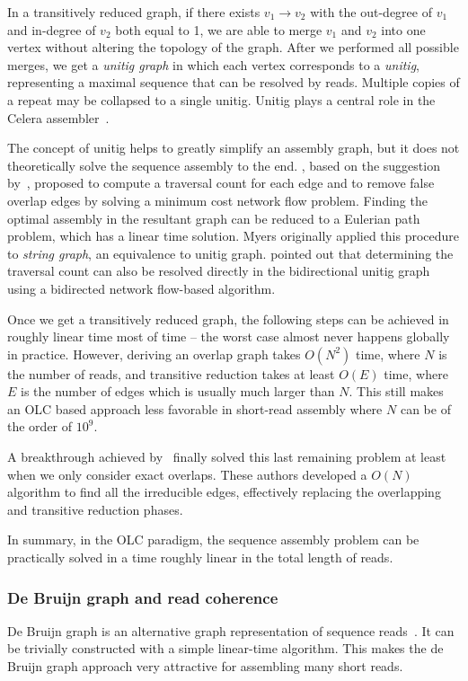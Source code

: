 \documentclass{bioinfo}
\begin{document}
\begin{methods}
In a transitively reduced graph, if there exists $v_1\to v_2$ with the
out-degree of $v_1$ and in-degree of $v_2$ both equal to 1, we are able
to merge $v_1$ and $v_2$ into one vertex without altering the topology of the
graph. After we performed all possible merges, we get a \emph{unitig graph} in
which each vertex corresponds to a \emph{unitig}, representing a maximal
sequence that can be resolved by reads. Multiple copies of a repeat may
be collapsed to a single unitig. Unitig plays a central role in the Celera
assembler~\citep{Myers:2000kl}.

The concept of unitig helps to greatly simplify an assembly graph, but it does
not theoretically solve the sequence assembly to the end. \citet{Myers:2005bh},
based on the suggestion by~\citet{Pevzner:2001vn}, proposed to compute a
traversal count for each edge and to remove false overlap edges by solving a
minimum cost network flow problem. Finding the optimal assembly in the resultant
graph can be reduced to a Eulerian path problem, which has a linear time
solution. Myers originally applied this procedure to \emph{string graph},
an equivalence to unitig graph. \citet{Medvedev:2009ve} pointed out
that determining the traversal count can also be resolved directly in the
bidirectional unitig graph using a bidirected network flow-based algorithm.

Once we get a transitively reduced graph, the following steps can be achieved
in roughly linear time most of time -- the worst case almost never happens
globally in practice. However, deriving an overlap graph takes $O(N^2)$ time,
where $N$ is the number of reads, and transitive reduction takes at least
$O(E)$ time, where $E$ is the number of edges which is usually much larger than
$N$. This still makes an OLC based approach less favorable in short-read
assembly where $N$ can be of the order of $10^9$.

A breakthrough achieved by~\citet{Simpson:2010uq,Simpson:2011ly} finally solved
this last remaining problem at least when we only consider exact overlaps.
These authors developed a $O(N)$ algorithm to find all the irreducible edges,
effectively replacing the overlapping and transitive reduction phases.

In summary, in the OLC paradigm, the sequence assembly problem can be
practically solved in a time roughly linear in the total length of reads.

\subsubsection{De Bruijn graph and read coherence}
De Bruijn graph is an alternative graph representation of sequence
reads~\citep{Idury:1995oq}.  It can be trivially constructed with a simple
linear-time algorithm. This makes the de Bruijn graph approach very attractive
for assembling many short reads.


\end{methods}
\end{document}
